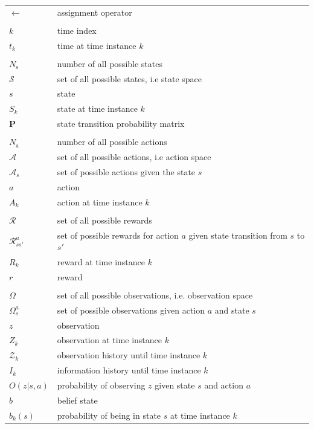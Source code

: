 \documentclass[english, 12pt, a4paper, elec, utf8, a-1b, online]{aaltothesis}
\numberwithin{equation}{section}
\renewcommand{\vec}[1]{\mathbf{#1}}
\newcommand{\Ss}{\mathcal{S}}
\newcommand{\As}{\mathcal{A}}
\newcommand{\Rs}{\mathcal{R}}
\newcommand{\Os}{\Omega}
\newcommand{\Op}{O}
\newcommand{\stprobs}{\vec{P}}
\newcommand{\nacts}{{N_\text{a}}}
\newcommand{\nstates}{{N_\text{s}}}
\begin{document}
\begin{longtable}{ll}
$\leftarrow$ & assignment operator \\
&\\
$k$ & time index \\
$t_k$ & time at time instance $k$ \\
&\\
$\nstates$ & number of all possible states \\
$\Ss$ & set of all possible states, i.e state space \\
$s$ & state \\
$S_k$ & state at time instance $k$ \\
$\stprobs$ & state transition probability matrix \\
&\\
$\nacts$ & number of all possible actions \\
$\As$ & set of all possible actions, i.e action space \\
$\As_s$ & set of possible actions given the state $s$ \\
$a$ & action \\
$A_k$ & action at time instance $k$ \\
&\\
$\Rs$ & set of all possible rewards \\
$\Rs_{ss'}^a$ & set of possible rewards for action $a$ given state transition from $s$ to $s'$ \\
$R_k$ & reward at time instance $k$ \\
$r$ & reward \\
&\\
$\Os$ & set of all possible observations, i.e. observation space \\
$\Os_s^a$ & set of possible observations given action $a$ and state $s$ \\
$z$ & observation \\
$Z_k$ & observation at time instance $k$ \\
$\mathcal{Z}_k$ & observation history until time instance $k$ \\
$I_k$ & information history until time instance $k$ \\
$\Op(z | s, a)$ & probability of observing $z$ given state $s$ and action $a$ \\
$b$ & belief state \\
$b_k(s)$ & probability of being in state $s$ at time instance $k$ \\

\end{longtable}
\end{document}
